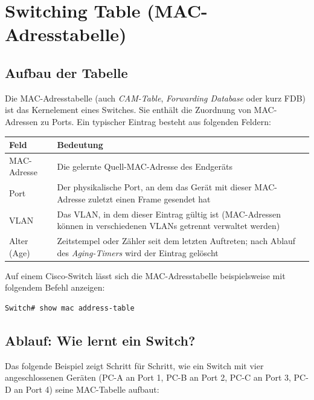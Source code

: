 \documentclass[11pt, oneside, numbers=nönddot]{scrbook}
\begin{document}
\newpage

\section{Switching Table (MAC-Adresstabelle)}
\subsection{Aufbau der Tabelle}
Die MAC-Adresstabelle (auch \textit{CAM-Table}, \textit{Forwarding Database} oder kurz FDB) ist das Kernelement eines Switches. Sie enthält die Zuordnung von MAC-Adressen zu Ports. Ein typischer Eintrag besteht aus folgenden Feldern:

\begin{longtable}{|p{3.5cm}|p{9.5cm}|}
\hline
\textbf{Feld} & \textbf{Bedeutung} \\
\hline
MAC-Adresse & Die gelernte Quell-MAC-Adresse des Endgeräts \\
\hline
Port & Der physikalische Port, an dem das Gerät mit dieser MAC-Adresse zuletzt einen Frame gesendet hat \\
\hline
VLAN & Das VLAN, in dem dieser Eintrag gültig ist (MAC-Adressen können in verschiedenen VLANs getrennt verwaltet werden) \\
\hline
Alter (Age) & Zeitstempel oder Zähler seit dem letzten Auftreten; nach Ablauf des \textit{Aging-Timers} wird der Eintrag gelöscht \\
\hline
\end{longtable}

Auf einem Cisco-Switch lässt sich die MAC-Adresstabelle beispielsweise mit folgendem Befehl anzeigen:
\begin{verbatim}
Switch# show mac address-table
\end{verbatim}

\subsection{Ablauf: Wie lernt ein Switch?}
Das folgende Beispiel zeigt Schritt für Schritt, wie ein Switch mit vier angeschlossenen Geräten (PC-A an Port 1, PC-B an Port 2, PC-C an Port 3, PC-D an Port 4) seine MAC-Tabelle aufbaut:
\end{document}
